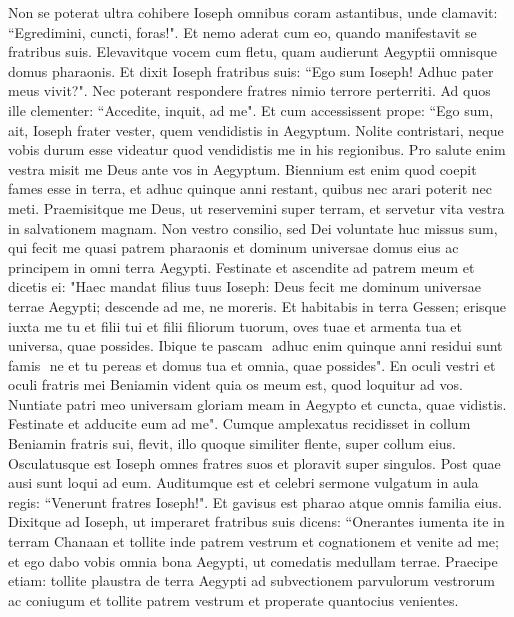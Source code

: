 \begin{biblechapter}  
\verse Non se poterat ultra cohibere Ioseph omnibus coram astantibus, unde clamavit: “Egredimini, cuncti, foras!". Et nemo aderat cum eo, quando manifestavit se fratribus suis. 
\verse Elevavitque vocem cum fletu, quam audierunt Aegyptii omnisque domus pharaonis. 
\verse Et dixit Ioseph fratribus suis: “Ego sum Ioseph! Adhuc pater meus vivit?". Nec poterant respondere fratres nimio terrore perterriti. 
\verse Ad quos ille clementer: “Accedite, inquit, ad me". Et cum accessissent prope: “Ego sum, ait, Ioseph frater vester, quem vendidistis in Aegyptum. 
\verse Nolite contristari, neque vobis durum esse videatur quod vendidistis me in his regionibus. Pro salute enim vestra misit me Deus ante vos in Aegyptum. 
\verse Biennium est enim quod coepit fames esse in terra, et adhuc quinque anni restant, quibus nec arari poterit nec meti. 
\verse Praemisitque me Deus, ut reservemini super terram, et servetur vita vestra in salvationem magnam. 
\verse Non vestro consilio, sed Dei voluntate huc missus sum, qui fecit me quasi patrem pharaonis et dominum universae domus eius ac principem in omni terra Aegypti. 
\verse Festinate et ascendite ad patrem meum et dicetis ei: "Haec mandat filius tuus Ioseph: Deus fecit me dominum universae terrae Aegypti; descende ad me, ne moreris. 
\verse Et habitabis in terra Gessen; erisque iuxta me tu et filii tui et filii filiorum tuorum, oves tuae et armenta tua et universa, quae possides.  
\verse Ibique te pascam ­ adhuc enim quinque anni residui sunt famis ­ ne et tu pereas et domus tua et omnia, quae possides". 
\verse En oculi vestri et oculi fratris mei Beniamin vident quia os meum est, quod loquitur ad vos. 
\verse Nuntiate patri meo universam gloriam meam in Aegypto et cuncta, quae vidistis. Festinate et adducite eum ad me". 
\verse Cumque amplexatus recidisset in collum Beniamin fratris sui, flevit, illo quoque similiter flente, super collum eius. 
\verse Osculatusque est Ioseph omnes fratres suos et ploravit super singulos. Post quae ausi sunt loqui ad eum. 
\verse Auditumque est et celebri sermone vulgatum in aula regis: “Venerunt fratres Ioseph!". Et gavisus est pharao atque omnis familia eius. 
\verse Dixitque ad Ioseph, ut imperaret fratribus suis dicens: “Onerantes iumenta ite in terram Chanaan 
\verse et tollite inde patrem vestrum et cognationem et venite ad me; et ego dabo vobis omnia bona Aegypti, ut comedatis medullam terrae. 
\verse Praecipe etiam: tollite plaustra de terra Aegypti ad subvectionem parvulorum vestrorum ac coniugum et tollite patrem vestrum et properate quantocius venientes. 

\end{biblechapter}
